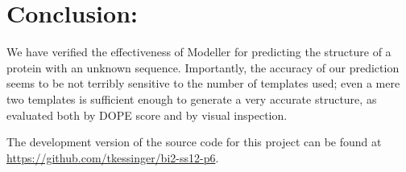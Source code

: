 \documentclass[]{report}   %
\begin{document}
\section*{Conclusion:}   
We have verified the effectiveness of Modeller for predicting the structure of a protein with an unknown sequence. Importantly, the accuracy of our prediction seems to be not terribly sensitive to the number of templates used; even a mere two templates is sufficient enough to generate a very accurate structure, as evaluated both by DOPE score and by visual inspection.

The development version of the source code for this project can be found at \url{https://github.com/tkessinger/bi2-ss12-p6}.




  
\end{document}
